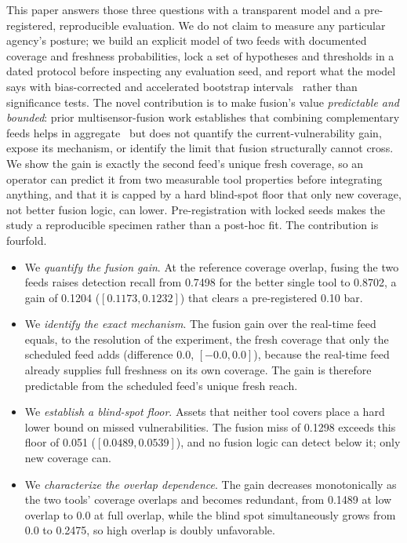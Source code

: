 \documentclass[journal]{IEEEtran}
\begin{document}
This paper answers those three questions with a transparent model and a pre-registered, reproducible
evaluation. We do not claim to measure any particular agency's posture; we build an explicit model of two feeds
with documented coverage and freshness probabilities, lock a set of hypotheses and thresholds in a
dated protocol before inspecting any evaluation seed, and report what the model says with
bias-corrected and accelerated bootstrap intervals~\cite{efron1987bca} rather than
significance tests. The novel contribution is to make fusion's value \emph{predictable and bounded}:
prior multisensor-fusion work establishes that combining complementary feeds helps in
aggregate~\cite{hall1997fusion,bass2000fusion} but does not quantify the current-vulnerability gain,
expose its mechanism, or identify the limit that fusion structurally cannot cross. We show the gain
is exactly the second feed's unique fresh coverage, so an operator can predict it from two measurable
tool properties before integrating anything, and that it is capped by a hard blind-spot floor that
only new coverage, not better fusion logic, can lower. Pre-registration with locked seeds makes the
study a reproducible specimen rather than a post-hoc fit. The contribution is fourfold.

\begin{itemize}
\item We \emph{quantify the fusion gain}. At the reference coverage overlap, fusing the two feeds
raises detection recall from 0.7498 for the better single tool to 0.8702, a gain of 0.1204
($[0.1173, 0.1232]$) that clears a pre-registered 0.10 bar.
\item We \emph{identify the exact mechanism}. The fusion gain over the real-time feed equals,
to the resolution of the experiment, the fresh coverage that only the scheduled feed adds
(difference 0.0, $[-0.0, 0.0]$), because the real-time feed already supplies full freshness on its
own coverage. The gain is therefore predictable from the scheduled feed's unique fresh reach.
\item We \emph{establish a blind-spot floor}. Assets that neither tool covers place a hard lower
bound on missed vulnerabilities. The fusion miss of 0.1298 exceeds this floor of 0.051
($[0.0489, 0.0539]$), and no fusion logic can detect below it; only new coverage can.
\item We \emph{characterize the overlap dependence}. The gain decreases monotonically as the two
tools' coverage overlaps and becomes redundant, from 0.1489 at low overlap to 0.0 at full overlap,
while the blind spot simultaneously grows from 0.0 to 0.2475, so high overlap is doubly
unfavorable.
\end{itemize}
\end{document}
